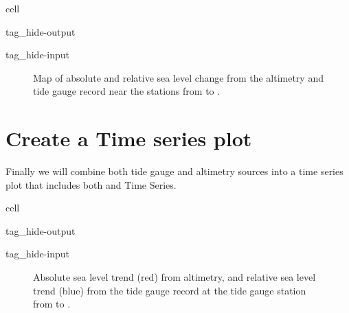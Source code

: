 \documentclass[letterpaper,10pt,english]{jupyterBook}
\begin{document}
\begin{sphinxuseclass}{cell}
\begin{sphinxuseclass}{tag_hide-output}
\begin{sphinxuseclass}{tag_hide-input}
\end{sphinxuseclass}
\end{sphinxuseclass}
\end{sphinxuseclass}
\begin{figure}[htbp]
\centering
\capstart

\noindent{}
\caption{Map of absolute and relative sea level change from the altimetry and tide gauge record near the  stations from  to .}\label{\detokenize{notebooks/regional_and_local/SL_Trend:fig-mag}}
\begin{sphinxlegend}
\sphinxAtStartPar
{}
\end{sphinxlegend}
\end{figure}


\chapter{Create a Time series plot}
\label{\detokenize{notebooks/regional_and_local/SL_Trend:create-a-time-series-plot}}\label{\detokenize{notebooks/regional_and_local/SL_Trend:id5}}
\sphinxAtStartPar
Finally we will combine both tide gauge and altimetry sources into a time series plot that includes both {\hyperref[\detokenize{notebooks/regional_and_local/SL_Trend:asltimeseries}]{}}  and {\hyperref[\detokenize{notebooks/regional_and_local/SL_Trend:rsltimeseries}]{}} Time Series.

\begin{sphinxuseclass}{cell}
\begin{sphinxuseclass}{tag_hide-output}
\begin{sphinxuseclass}{tag_hide-input}
\end{sphinxuseclass}
\end{sphinxuseclass}
\end{sphinxuseclass}
\begin{figure}[htbp]
\centering
\capstart

\noindent{}
\caption{Absolute sea level trend (red) from altimetry, and relative sea level trend (blue) from the tide gauge record at the  tide gauge station from  to .}\label{\detokenize{notebooks/regional_and_local/SL_Trend:trend-fig-station}}\end{figure}
\end{document}
